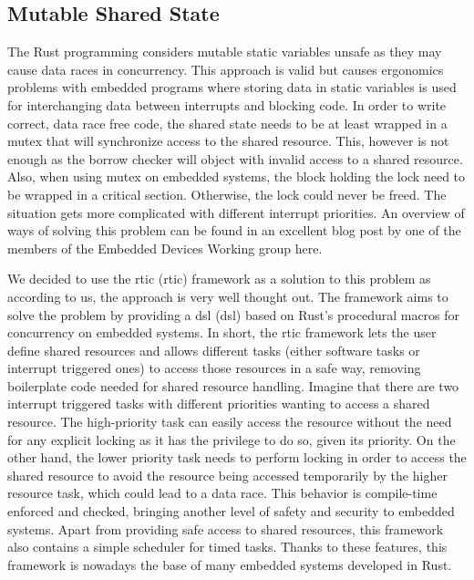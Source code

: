\subsection{Mutable Shared State}
\label{subsec:mut_shared_state}
The Rust programming considers mutable static variables unsafe as they may cause data races in concurrency\cite{noauthor_static_nodate}.
This approach is valid but causes ergonomics problems with embedded programs where storing data in static variables is used for interchanging data between interrupts and blocking code.
In order to write correct, data race free code, the shared state needs to be at least wrapped in a mutex that will synchronize access to the shared resource.
This, however is not enough as the borrow checker will object with invalid access to a shared resource.
Also, when using mutex on embedded systems, the block holding the lock need to be wrapped in a critical section.
Otherwise, the lock could never be freed.
The situation gets more complicated with different interrupt priorities.
An overview of ways of solving this problem can be found in an excellent blog post by one of the members of the Embedded Devices Working group here\cite{egger_look_nodate}.

We decided to use the \acs{rtic} (\acl{rtic}) framework\cite{noauthor_preface_nodate} as a solution to this problem as according to us, the approach is very well thought out.
The framework aims to solve the problem by providing a \acs{dsl} (\acl{dsl}) based on Rust's procedural macros for concurrency on embedded systems.
In short, the \acs{rtic} framework lets the user define shared resources and allows different tasks (either software tasks or interrupt triggered ones) to access those resources in a safe way, removing boilerplate code needed for shared resource handling.
Imagine that there are two interrupt triggered tasks with different priorities wanting to access a shared resource.
The high-priority task can easily access the resource without the need for any explicit locking as it has the privilege to do so, given its priority.
On the other hand, the lower priority task needs to perform locking in order to access the shared resource to avoid the resource being accessed temporarily by the higher resource task, which could lead to a data race.
This behavior is compile-time enforced and checked, bringing another level of safety and security to embedded systems.
Apart from providing safe access to shared resources, this framework also contains a simple scheduler for timed tasks.
Thanks to these features, this framework is nowadays the base of many embedded systems developed in Rust.

